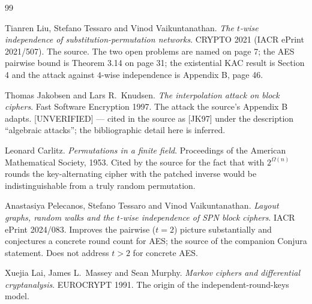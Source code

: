 \documentclass{conjura-conjecture}
\newcommand{\Om}{\Omega}
\begin{document}
\begin{conjurabibliography}{99}

Tianren Liu, Stefano Tessaro and Vinod Vaikuntanathan.
\emph{The $t$-wise independence of substitution-permutation networks}.
CRYPTO 2021 (IACR ePrint 2021/507).
The source. The two open problems are named on page 7; the AES pairwise
bound is Theorem 3.14 on page 31; the existential KAC result is Section 4
and the attack against $4$-wise independence is Appendix B, page 46.

Thomas Jakobsen and Lars R.\ Knudsen.
\emph{The interpolation attack on block ciphers}.
Fast Software Encryption 1997.
The attack the source's Appendix B adapts. [UNVERIFIED] --- cited in the
source as [JK97] under the description ``algebraic attacks''; the
bibliographic detail here is inferred.

Leonard Carlitz.
\emph{Permutations in a finite field}.
Proceedings of the American Mathematical Society, 1953.
Cited by the source for the fact that with $2^{\Om(n)}$ rounds the
key-alternating cipher with the patched inverse would be
indistinguishable from a truly random permutation.

Anastasiya Pelecanos, Stefano Tessaro and Vinod Vaikuntanathan.
\emph{Layout graphs, random walks and the $t$-wise independence of SPN
block ciphers}.
IACR ePrint 2024/083.
Improves the pairwise ($t = 2$) picture substantially and conjectures a
concrete round count for AES\@; the source of the companion Conjura
statement. Does not address $t > 2$ for concrete AES\@.

Xuejia Lai, James L.\ Massey and Sean Murphy.
\emph{Markov ciphers and differential cryptanalysis}.
EUROCRYPT 1991.
The origin of the independent-round-keys model.

\end{conjurabibliography}
\end{document}
